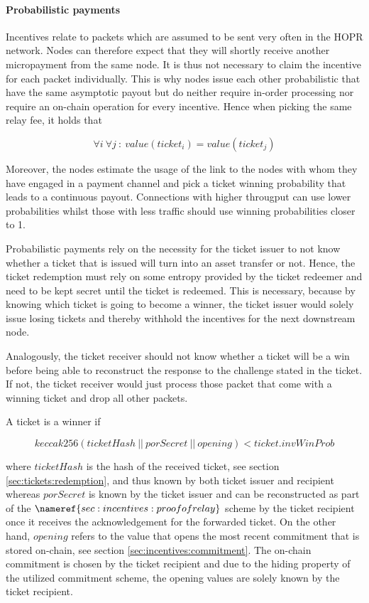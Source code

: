 \paragraph{Probabilistic payments}
\label{sec:incentives:probabilistic:probabilistic}

Incentives relate to packets which are assumed to be sent very often in the HOPR network. Nodes can therefore expect that they will shortly receive another micropayment from the same node. It is thus not necessary to claim the incentive for each packet individually. This is why nodes issue each other probabilistic  that have the same asymptotic payout but do neither require in-order processing nor require an on-chain operation for every incentive. Hence when picking the same relay fee, it holds that

$$ \forall i \ \forall j \ : \ value(ticket_i) = value(ticket_j) $$

Moreover, the nodes estimate the usage of the link to the nodes with whom they have engaged in a payment channel and pick a ticket winning probability that leads to a continuous payout. Connections with higher througput can use lower probabilities whilst those with less traffic should use winning probabilities closer to 1.

Probabilistic payments rely on the necessity for the ticket issuer to not know whether a ticket that is issued will turn into an asset transfer or not. Hence, the ticket redemption must rely on some entropy provided by the ticket redeemer and need to be kept secret until the ticket is redeemed. This is necessary, because by knowing which ticket is going to become a winner, the ticket issuer would solely issue losing tickets and thereby withhold the incentives for the next downstream node.

Analogously, the ticket receiver should not know whether a ticket will be a win before being able to reconstruct the response to the challenge stated in the ticket. If not, the ticket receiver would just process those packet that come with a winning ticket and drop all other packets.

A ticket is a winner if

$$ keccak256 ( ticketHash \ || \ porSecret \ || \ opening) < ticket.invWinProb $$

where $ticketHash$ is the hash of the received ticket, see section \ref{sec:tickets:redemption}, and thus known by both ticket issuer and recipient whereas $porSecret$ is known by the ticket issuer and can be reconstructed as part of the $\nameref{sec:incentives:proofofrelay}$ scheme by the ticket recipient once it receives the acknowledgement for the forwarded ticket. On the other hand, $opening$ refers to the value that opens the most recent commitment that is stored on-chain, see section \ref{sec:incentives:commitment}. The on-chain commitment is chosen by the ticket recipient and due to the hiding property of the utilized commitment scheme, the opening values are solely known by the ticket recipient.